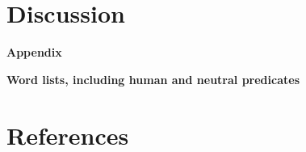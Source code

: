 \documentclass[
  10pt,
  dvipsnames,enabledeprecatedfontcommands]{scrartcl}
\begin{document}
\hypertarget{discussion}{%
\section{Discussion}\label{discussion}}

\newpage

\noindent \huge  \textbf{Appendix} \normalsize

\noindent \Large \textbf{Word lists, including human and neutral predicates}
\normalsize

\hypertarget{references}{%
\section*{References}\label{references}}

\vspace{-3mm}
\end{document}
